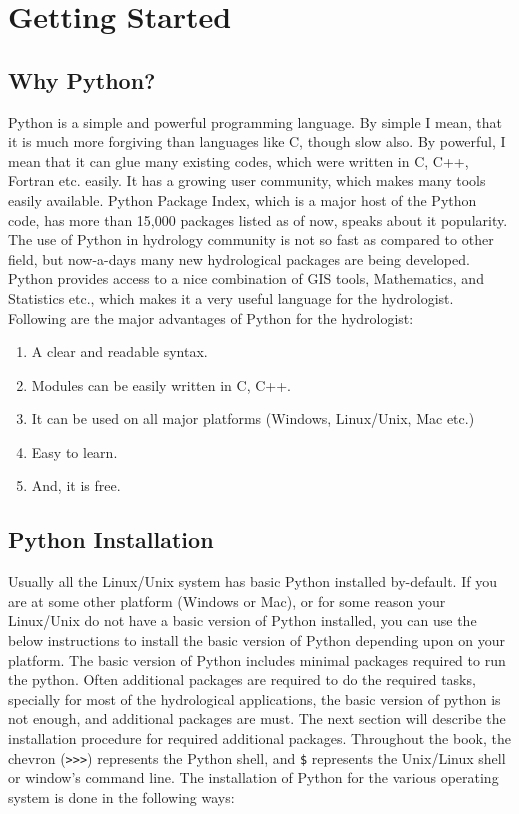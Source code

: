 \documentclass[10pt]{book}
\begin{document}
\mainmatter

\chapter{Getting Started}

\section{Why Python?}
Python is a simple and powerful programming language. 
By simple I mean, that it is much more forgiving than languages like 
C, though slow also. By powerful, I mean that it can glue many existing codes,  
which were written in C, C++, Fortran etc. easily. 
It has a growing user community, which makes many tools easily available. 
Python Package Index, which is a major host of the Python code, 
has more than 15,000 packages listed as of now, speaks about it popularity. 
The use of Python in hydrology community is not so fast as compared to other field, 
but now-a-days many new hydrological packages are being developed. 
Python provides access to a nice combination of GIS tools, Mathematics, 
and Statistics etc., which makes it a very useful language for the hydrologist. 
Following are the major advantages of Python for the hydrologist:
\begin{enumerate}
\item A clear and readable syntax. \
\item Modules can be easily written in C, C++. \
\item It can be used on all major platforms (Windows, Linux/Unix, Mac etc.) \
\item Easy to learn. \
\item And, it is free. \
\end{enumerate}

\index{Why Python}

\section{Python Installation}
Usually all the Linux/Unix system has basic Python installed by-default. If you are at
some other platform (Windows or Mac), or for some reason your Linux/Unix do not have 
a basic version of Python installed, you can use the below instructions to install the 
basic version of Python depending upon on your platform.  
The basic version of Python includes minimal packages required to run the python. 
Often additional packages are required to do the required tasks, specially for most 
of the hydrological applications, the basic version of python is not enough, 
and additional packages are must. The next section will describe the installation 
procedure for required additional packages. 
Throughout the book, the chevron (\verb">>>") represents the Python shell, 
and {\verb"$"} represents the Unix/Linux shell or window's command line. 
The installation of Python for the various operating system is done in the 
following ways:
\end{document}
